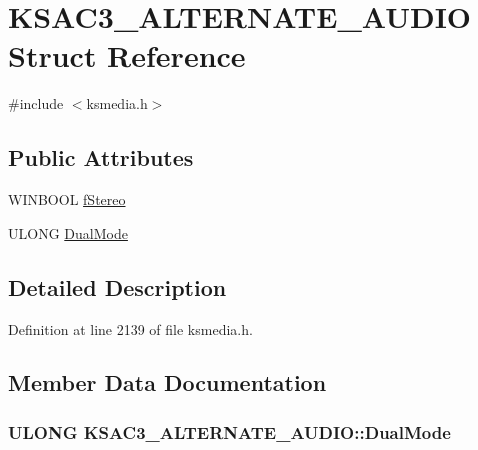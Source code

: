 \hypertarget{struct_k_s_a_c3___a_l_t_e_r_n_a_t_e___a_u_d_i_o}{}\section{K\+S\+A\+C3\+\_\+\+A\+L\+T\+E\+R\+N\+A\+T\+E\+\_\+\+A\+U\+D\+IO Struct Reference}
\label{struct_k_s_a_c3___a_l_t_e_r_n_a_t_e___a_u_d_i_o}


{\ttfamily \#include $<$ksmedia.\+h$>$}

\subsection*{Public Attributes}
\begin{DoxyCompactItemize}
\item 
W\+I\+N\+B\+O\+OL \hyperlink{struct_k_s_a_c3___a_l_t_e_r_n_a_t_e___a_u_d_i_o_a56f589d27a086677b582e134a340e72c}{f\+Stereo}
\item 
U\+L\+O\+NG \hyperlink{struct_k_s_a_c3___a_l_t_e_r_n_a_t_e___a_u_d_i_o_a624d5ac5d500d5cb1a3ea5da89302ff2}{Dual\+Mode}
\end{DoxyCompactItemize}


\subsection{Detailed Description}


Definition at line 2139 of file ksmedia.\+h.



\subsection{Member Data Documentation}
\subsubsection[{\texorpdfstring{Dual\+Mode}{DualMode}}]{\setlength{\rightskip}{0pt plus 5cm}U\+L\+O\+NG K\+S\+A\+C3\+\_\+\+A\+L\+T\+E\+R\+N\+A\+T\+E\+\_\+\+A\+U\+D\+I\+O\+::\+Dual\+Mode}\hypertarget{struct_k_s_a_c3___a_l_t_e_r_n_a_t_e___a_u_d_i_o_a624d5ac5d500d5cb1a3ea5da89302ff2}{}\label{struct_k_s_a_c3___a_l_t_e_r_n_a_t_e___a_u_d_i_o_a624d5ac5d500d5cb1a3ea5da89302ff2}


